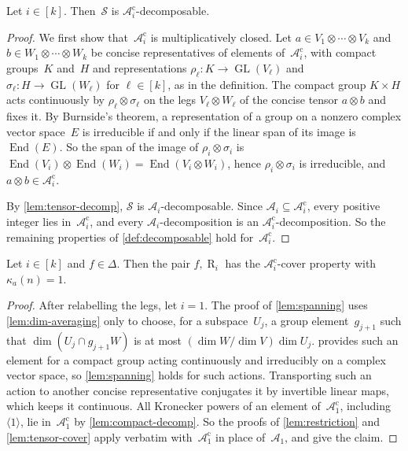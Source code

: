 \documentclass[11pt,letterpaper]{article}
\DeclareMathOperator{\tensorrank}{R}
\DeclareMathOperator{\GL}{GL}
\DeclareMathOperator{\End}{End}
\begin{document}
\begin{lemma}\label{lem:compact-decomp}
Let $i \in [k]$. Then~$\mathcal{S}$ is $\mathcal{A}^{\mathrm{c}}_i$-decomposable.
\end{lemma}
\begin{proof}
We first show that~$\mathcal{A}^{\mathrm{c}}_i$ is multiplicatively closed. Let $a \in V_1 \otimes \cdots \otimes V_k$ and $b \in W_1 \otimes \cdots \otimes W_k$ be concise representatives of elements of~$\mathcal{A}^{\mathrm{c}}_i$, with compact groups~$K$ and~$H$ and representations $\rho_\ell : K \to \GL(V_\ell)$ and $\sigma_\ell : H \to \GL(W_\ell)$ for $\ell \in [k]$, as in the definition. The compact group $K \times H$ acts continuously by $\rho_\ell \otimes \sigma_\ell$ on the legs $V_\ell \otimes W_\ell$ of the concise tensor $a \otimes b$ and fixes it. By Burnside's theorem, a representation of a group on a nonzero complex vector space~$E$ is irreducible if and only if the linear span of its image is~$\End(E)$. So the span of the image of $\rho_i \otimes \sigma_i$ is $\End(V_i) \otimes \End(W_i) = \End(V_i \otimes W_i)$, hence $\rho_i \otimes \sigma_i$ is irreducible, and $a \otimes b \in \mathcal{A}^{\mathrm{c}}_i$.

By \cref{lem:tensor-decomp}, $\mathcal{S}$ is $\mathcal{A}_i$-decomposable. Since $\mathcal{A}_i \subseteq \mathcal{A}^{\mathrm{c}}_i$, every positive integer lies in~$\mathcal{A}^{\mathrm{c}}_i$, and every $\mathcal{A}_i$-decomposition is an $\mathcal{A}^{\mathrm{c}}_i$-decomposition. So the remaining properties of \cref{def:decomposable} hold for~$\mathcal{A}^{\mathrm{c}}_i$.
\end{proof}

\begin{lemma}\label{lem:compact-cover}
Let $i \in [k]$ and $f \in \Delta$. Then the pair $f, \tensorrank_i$ has the $\mathcal{A}^{\mathrm{c}}_i$-cover property with $\kappa_a(n) = 1$.
\end{lemma}
\begin{proof}
After relabelling the legs, let $i = 1$. The proof of \cref{lem:spanning} uses \cref{lem:dim-averaging} only to choose, for a subspace~$U_j$, a group element~$g_{j+1}$ such that $\dim(U_j \cap g_{j+1}W)$ is at most $(\dim W/\dim V) \dim U_j$.  provides such an element for a compact group acting continuously and irreducibly on a complex vector space, so \cref{lem:spanning} holds for such actions. Transporting such an action to another concise representative conjugates it by invertible linear maps, which keeps it continuous. All Kronecker powers of an element of~$\mathcal{A}^{\mathrm{c}}_1$, including~$\langle 1 \rangle$, lie in~$\mathcal{A}^{\mathrm{c}}_1$ by \cref{lem:compact-decomp}. So the proofs of \cref{lem:restriction} and \cref{lem:tensor-cover} apply verbatim with~$\mathcal{A}^{\mathrm{c}}_1$ in place of~$\mathcal{A}_1$, and give the claim.
\end{proof}
\end{document}
